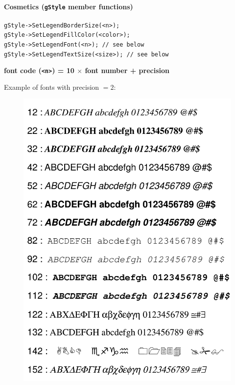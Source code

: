 \documentclass[10pt, oneside]{article}
\begin{document}
\paragraph{Cosmetics (\texttt{gStyle} member functions)}
\begin{verbatim}
gStyle->SetLegendBorderSize(<n>);
gStyle->SetLegendFillColor(<color>);
gStyle->SetLegendFont(<n>); // see below
gStyle->SetLegendTextSize(<size>); // see below
\end{verbatim}
\begin{center}
\textbf{font code (\texttt{<n>}) = 10 $\times$ font number + precision}
\end{center}
Example of fonts with precision $= 2$:
\begin{figure}[h!]
\centering
\includegraphics[scale=0.15]{fonts.png}
\end{figure}
\end{document}
